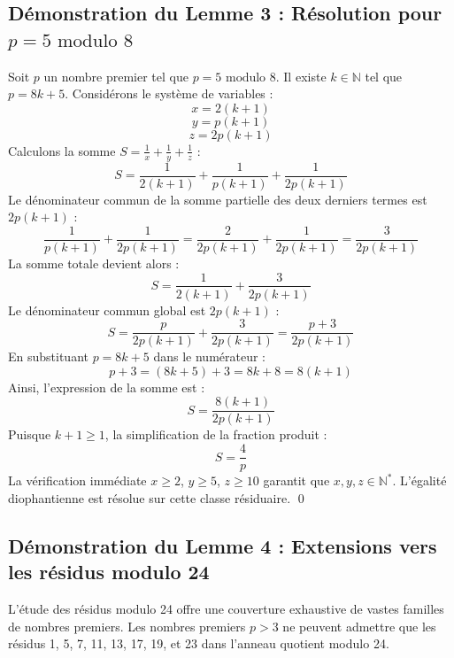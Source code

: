 \documentclass[12pt, a4paper]{article}
\begin{document}
\newpage
\subsection{D\'emonstration du Lemme 3 : R\'esolution pour $p = 5 \text{ modulo } 8$}
Soit $p$ un nombre premier tel que $p = 5 \text{ modulo } 8$. Il existe $k \in \mathbb{N}$ tel que $p = 8k+5$.
Consid\'erons le syst\`eme de variables :
\begin{equation}
x = 2(k+1)
\end{equation}
\begin{equation}
y = p(k+1)
\end{equation}
\begin{equation}
z = 2p(k+1)
\end{equation}
Calculons la somme $S = \frac{1}{x} + \frac{1}{y} + \frac{1}{z}$ :
\begin{equation}
S = \frac{1}{2(k+1)} + \frac{1}{p(k+1)} + \frac{1}{2p(k+1)}
\end{equation}
Le d\'enominateur commun de la somme partielle des deux derniers termes est $2p(k+1)$ :
\begin{equation}
\frac{1}{p(k+1)} + \frac{1}{2p(k+1)} = \frac{2}{2p(k+1)} + \frac{1}{2p(k+1)} = \frac{3}{2p(k+1)}
\end{equation}
La somme totale devient alors :
\begin{equation}
S = \frac{1}{2(k+1)} + \frac{3}{2p(k+1)}
\end{equation}
Le d\'enominateur commun global est $2p(k+1)$ :
\begin{equation}
S = \frac{p}{2p(k+1)} + \frac{3}{2p(k+1)} = \frac{p+3}{2p(k+1)}
\end{equation}
En substituant $p = 8k+5$ dans le num\'erateur :
\begin{equation}
p+3 = (8k+5) + 3 = 8k+8 = 8(k+1)
\end{equation}
Ainsi, l'expression de la somme est :
\begin{equation}
S = \frac{8(k+1)}{2p(k+1)}
\end{equation}
Puisque $k+1 \ge 1$, la simplification de la fraction produit :
\begin{equation}
S = \frac{4}{p}
\end{equation}
La v\'erification imm\'ediate $x \ge 2$, $y \ge 5$, $z \ge 10$ garantit que $x, y, z \in \mathbb{N}^*$.
L'\'egalit\'e diophantienne est r\'esolue sur cette classe r\'esiduaire. \qed

\newpage
\subsection{D\'emonstration du Lemme 4 : Extensions vers les r\'esidus modulo 24}
L'\'etude des r\'esidus modulo 24 offre une couverture exhaustive de vastes familles de nombres premiers. Les nombres premiers $p > 3$ ne peuvent admettre que les r\'esidus 1, 5, 7, 11, 13, 17, 19, et 23 dans l'anneau quotient modulo 24.
\end{document}
